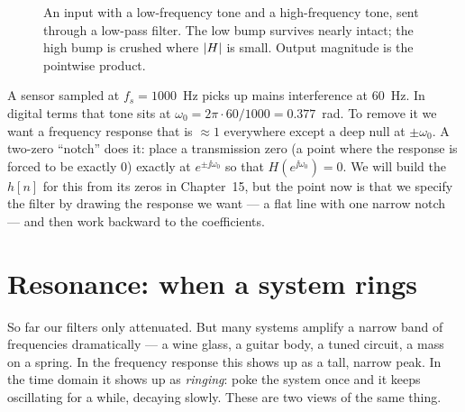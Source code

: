 \begin{figure}[H]
\centering
{}
\caption{An input with a low-frequency tone and a high-frequency tone, sent
through a low-pass filter. The low bump survives nearly intact; the high bump is
crushed where $\lvert H\rvert$ is small. Output magnitude is the pointwise product.}
\label{ch14:fig-reshape}
\end{figure}

\begin{example}
\label{ch14:ex-notch}
A sensor sampled at $f_s = 1000$~Hz picks up mains interference at $60$~Hz. In
digital terms that tone sits at $\omega_0 = 2\pi\cdot 60/1000 = 0.377$~rad. To
remove it we want a frequency response that is $\approx 1$ everywhere except a
deep null at $\pm\omega_0$. A two-zero ``notch'' does it: place a transmission
zero (a point where the response is forced to be exactly $0$) exactly at $e^{\pm\jj\omega_0}$ so that $H(e^{\jj\omega_0})=0$. We will
build the $h[n]$ for this from its zeros in Chapter~15, but the point now is
that we specify the filter by drawing the response we want --- a flat line with
one narrow notch --- and then work backward to the coefficients.
\end{example}

\section{Resonance: when a system rings}
\label{ch14:resonance}

So far our filters only attenuated. But many systems amplify a narrow band of
frequencies dramatically --- a wine glass, a guitar body, a tuned circuit, a
mass on a spring. In the frequency response this shows up as a tall, narrow peak.
In the time domain it shows up as \emph{ringing}: poke the system once and it
keeps oscillating for a while, decaying slowly. These are two views of the same
thing.

